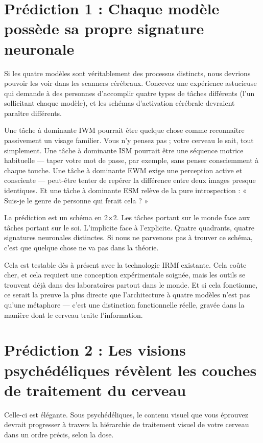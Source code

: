 \documentclass[11pt, twoside, openright]{book}
\begin{document}
\section*{Prédiction 1 : Chaque modèle possède sa propre signature neuronale}

Si les quatre modèles sont véritablement des processus distincts, nous devrions pouvoir les voir dans les scanners cérébraux. Concevez une expérience astucieuse qui demande à des personnes d'accomplir quatre types de tâches différents (l'un sollicitant chaque modèle), et les schémas d'activation cérébrale devraient paraître différents.

Une tâche à dominante IWM pourrait être quelque chose comme reconnaître passivement un visage familier. Vous n'y pensez pas ; votre cerveau le sait, tout simplement. Une tâche à dominante ISM pourrait être une séquence motrice habituelle --- taper votre mot de passe, par exemple, sans penser consciemment à chaque touche. Une tâche à dominante EWM exige une perception active et consciente --- peut-être tenter de repérer la différence entre deux images presque identiques. Et une tâche à dominante ESM relève de la pure introspection : « Suis-je le genre de personne qui ferait cela ? »

La prédiction est un schéma en 2×2. Les tâches portant sur le monde face aux tâches portant sur le soi. L'implicite face à l'explicite. Quatre quadrants, quatre signatures neuronales distinctes. Si nous ne parvenons pas à trouver ce schéma, c'est que quelque chose ne va pas dans la théorie.

Cela est testable dès à présent avec la technologie IRMf existante. Cela coûte cher, et cela requiert une conception expérimentale soignée, mais les outils se trouvent déjà dans des laboratoires partout dans le monde. Et si cela fonctionne, ce serait la preuve la plus directe que l'architecture à quatre modèles n'est pas qu'une métaphore --- c'est une distinction fonctionnelle réelle, gravée dans la manière dont le cerveau traite l'information.

\section*{Prédiction 2 : Les visions psychédéliques révèlent les couches de traitement du cerveau}

Celle-ci est élégante. Sous psychédéliques, le contenu visuel que vous éprouvez devrait progresser à travers la hiérarchie de traitement visuel de votre cerveau dans un ordre précis, selon la dose.
\end{document}
